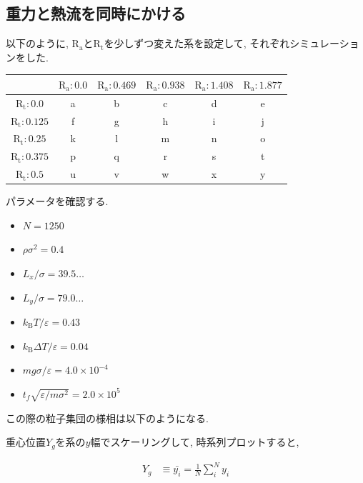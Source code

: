 \subsection{重力と熱流を同時にかける}

以下のように, $\text{R}_\text{a}$と$\text{R}_\text{t}$を少しずつ変えた系を設定して, それぞれシミュレーションをした.



\begin{tabular}{|c|c|c|c|c|c|} \hline
        & $\text{R}_\text{a}:0.0$ & $\text{R}_\text{a}:0.469$ & $\text{R}_\text{a}:0.938$ & $\text{R}_\text{a}:1.408$ & $\text{R}_\text{a}:1.877$ \\ \hline
  $\text{R}_\text{t}:0.0$ & a      & b      & c      & d      & e     \\ \hline
  $\text{R}_\text{t}:0.125$ & f      & g      & h      & i      & j     \\ \hline
  $\text{R}_\text{t}:0.25$ & k      & l      & m      & n      & o     \\ \hline
  $\text{R}_\text{t}:0.375$ & p      & q      & r      & s      & t     \\ \hline
  $\text{R}_\text{t}:0.5$ & u      & v      & w      & x      & y     \\ \hline
\end{tabular}



パラメータを確認する.

\begin{itemize}
  \item $N = 1250$
  \item $\rho {\sigma}^2 = 0.4$
  \item $L_x / \sigma = 39.5\dots$
  \item $L_y / \sigma = 79.0\dots$
  \item $k_{\text{B}} T / \varepsilon = 0.43$
  \item $k_{\text{B}} \Delta T / \varepsilon = 0.04$
  \item $mg\sigma/\varepsilon = 4.0 \times 10^{-4}$
  \item $t_f \sqrt{\varepsilon / m \sigma^2} = 2.0 \times 10^{5}$
\end{itemize}

この際の粒子集団の様相は以下のようになる.



重心位置$Y_g$を系の$y$幅でスケーリングして, 時系列プロットすると,

\begin{align}
  Y_g &\equiv \bar{y_i} = \frac{1}{N} \sum_{i}^{N} y_i
\end{align}

